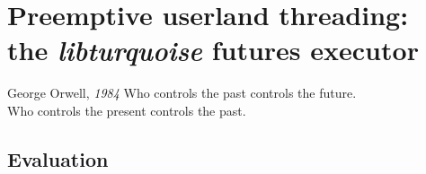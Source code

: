 \chapter{Preemptive userland threading: \\ the \textit{libturquoise} futures executor}
\label{chap:libturquoise}

\ifdefined\chapquotes
\vspace{-0.5in}
\begin{chapquote}[1.25in]{George Orwell, \textit{1984}}
Who controls the past controls the future. \\
Who controls the present controls the past.
\end{chapquote}
\fi

\begin{promotesubsections}
\begin{swallowsections}

\end{swallowsections}
\end{promotesubsections}


\section{Evaluation}




